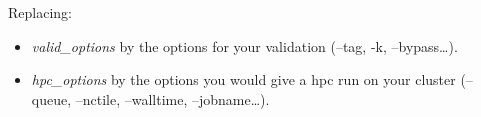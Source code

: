 Replacing:
\begin{itemize}
  \item \textit{valid\_options} by the options for your validation (--tag, -k,
    --bypass\ldots).
  \item \textit{hpc\_options} by the options you would give a hpc \telma{} run on
    your cluster (--queue, --nctile, --walltime, --jobname\ldots).
\end{itemize}
